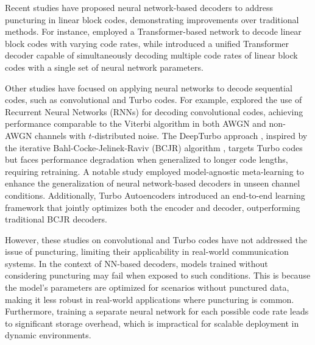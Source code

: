 Recent studies have proposed neural network-based decoders to address puncturing in linear block codes, demonstrating improvements over traditional methods. For instance, \cite{lbc_ecct} employed a Transformer-based network to decode linear block codes with varying code rates, while \cite{lbc_uecct} introduced a unified Transformer decoder capable of simultaneously decoding multiple code rates of linear block codes with a single set of neural network parameters.

Other studies have focused on applying neural networks to decode sequential codes, such as convolutional and Turbo codes. For example, \cite{comm_alg_via_dl} explored the use of Recurrent Neural Networks (RNNs) for decoding convolutional codes, achieving performance comparable to the Viterbi algorithm \cite{viterbi_alg_1967} in both AWGN and non-AWGN channels with $t$-distributed noise. The DeepTurbo approach \cite{deep_turbo}, inspired by the iterative Bahl-Cocke-Jelinek-Raviv (BCJR) algorithm \cite{bcjr_alg_1974}, targets Turbo codes but faces performance degradation when generalized to longer code lengths, requiring retraining. A notable study \cite{mind_model_independent} employed model-agnostic meta-learning to enhance the generalization of neural network-based decoders in unseen channel conditions. Additionally, Turbo Autoencoders \cite{turbo_autoencoder} introduced an end-to-end learning framework that jointly optimizes both the encoder and decoder, outperforming traditional BCJR decoders.

However, these studies on convolutional and Turbo codes have not addressed the issue of puncturing, limiting their applicability in real-world communication systems. In the context of NN-based decoders, models trained without considering puncturing may fail when exposed to such conditions. This is because the model's parameters are optimized for scenarios without punctured data, making it less robust in real-world applications where puncturing is common. Furthermore, training a separate neural network for each possible code rate leads to significant storage overhead, which is impractical for scalable deployment in dynamic environments.
